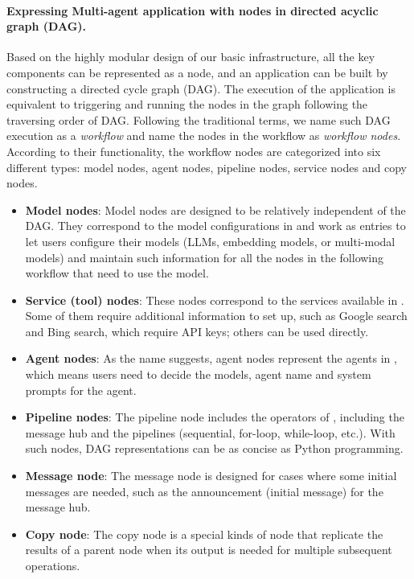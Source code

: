 \paragraph{Expressing Multi-agent application with nodes in directed acyclic graph (DAG).}
Based on the highly modular design of our basic infrastructure, all the key components can be represented as a node, and an application can be built by constructing a directed cycle graph (DAG). The execution of the application is equivalent to triggering and running the nodes in the graph following the traversing order of DAG. Following the traditional terms, we name such DAG execution as a \emph{workflow} and name the nodes in the workflow as \emph{workflow nodes}.  
According to their functionality, the workflow nodes are categorized into six different types: model nodes, agent nodes, pipeline nodes, service nodes and copy nodes.  
\begin{itemize}
    \item 
    {\bf Model nodes}: Model nodes are designed to be relatively independent of the DAG. They correspond to the model configurations in \ours and work as entries to let users configure their models (LLMs, embedding models, or multi-modal models) and maintain such information for all the nodes in the following workflow that need to use the model.
    
    \item 
    {\bf Service (tool) nodes}: These nodes correspond to the services available in \ours. Some of them require additional information to set up, such as Google search and Bing search, which require API keys; others can be used directly. 
    
    \item 
    {\bf Agent nodes}: As the name suggests, agent nodes represent the agents in \ours, which means users need to decide the models, agent name and system prompts for the agent. 

    \item 
    {\bf Pipeline nodes}: The pipeline node includes the operators of \ours, including the message hub and the pipelines (sequential, for-loop, while-loop, etc.). With such nodes, DAG representations can be as concise as Python programming.
    
    \item 
    {\bf Message node}: The message node is designed for cases where some initial messages are needed, such as the announcement (initial message) for the message hub.
    
    \item 
    {\bf Copy node}: The copy node is a special kinds of node that replicate the results of a parent node when its output is needed for multiple subsequent operations.
\end{itemize}


